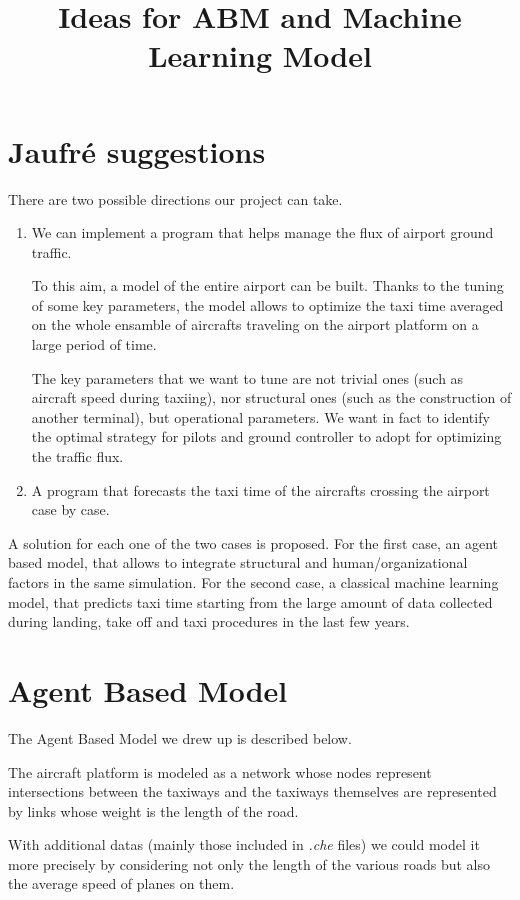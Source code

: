 \documentclass{article}
\begin{document}
	
	\title{Ideas for ABM and Machine Learning Model}
	\maketitle
	
\section*{Jaufré suggestions}
There are two possible directions our project can take.
\begin{enumerate}
	\item We can implement a program that helps manage the flux of airport ground traffic.
	
	 To this aim, a model of the entire airport can be built. Thanks to the tuning of some key parameters, the model allows to optimize the taxi time averaged on the whole ensamble of aircrafts traveling on the airport platform on a large period of time. 
	
	The key parameters that we want to tune are not trivial ones (such as aircraft speed during taxiing), nor structural ones (such as the construction of another terminal), but operational parameters. We want in fact to identify the optimal strategy for pilots and ground controller to adopt for optimizing the traffic flux.
	
	\item A program that forecasts the taxi time of the aircrafts crossing the airport case by case.
\end{enumerate}
A solution for each one of the two cases is proposed. For the first case, an agent based model, that allows to integrate structural and human/organizational factors in the same simulation. For the second case, a classical machine learning model, that predicts taxi time starting from the large amount of data collected during landing, take off and taxi procedures in the last few years.

\section{Agent Based Model}	
The Agent Based Model we drew up is described below. 

The aircraft platform is modeled as a network whose nodes represent intersections between the taxiways and the taxiways themselves are represented by links whose weight is the length of the road.

With additional datas (mainly those included in \textit{.che} files) we could model it more precisely by considering not only the length of the various roads but also the average speed of planes on them.
\end{document}
